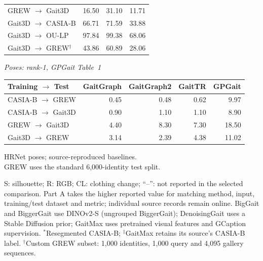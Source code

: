 \begin{table}[t]
\begin{minipage}[t]{0.49\textwidth}
\begin{tabular*}{\linewidth}{@{\extracolsep{\fill}}lrrr@{}}
GREW $\rightarrow$ Gait3D & 16.50 & 31.10 & 11.71 \\
Gait3D $\rightarrow$ CASIA-B & 66.71 & 71.59 & 33.88 \\
Gait3D $\rightarrow$ OU-LP & 97.84 & 99.38 & 68.06 \\
Gait3D $\rightarrow$ GREW$^{\dagger}$ & 43.86 & 60.89 & 28.06 \\
\bottomrule
\end{tabular*}
\end{minipage}\hfill
\begin{minipage}[t]{0.49\textwidth}
\textit{Poses: rank-1, GPGait Table~1~\cite{fu2023gpgait}}\par\vspace{2pt}
\begin{tabular*}{\linewidth}{@{\extracolsep{\fill}}lrrrr@{}}
\toprule
Training $\rightarrow$ Test & GaitGraph & GaitGraph2 & GaitTR & GPGait\\
\midrule
CASIA-B $\rightarrow$ GREW & 0.45 & 0.48 & 0.62 & 9.97 \\
CASIA-B $\rightarrow$ Gait3D & 0.90 & 1.10 & 1.10 & 8.90 \\
GREW $\rightarrow$ Gait3D & 4.40 & 8.30 & 7.30 & 18.50 \\
Gait3D $\rightarrow$ GREW & 3.14 & 2.39 & 4.38 & 11.02 \\
\bottomrule
\end{tabular*}
\par\vspace{3pt}
HRNet poses; source-reproduced baselines.\\
GREW uses the standard 6,000-identity test split.
\end{minipage}
\par\vspace{4pt}
\begin{minipage}{\textwidth}
\fontsize{7.5}{8.8}\selectfont
S: silhouette; R: RGB; CL: clothing change; ``--'': not reported in the selected comparison.
Part A takes the higher reported value for matching method, input, training/test dataset and metric; individual source records remain online.
BigGait and BiggerGait use DINOv2-S (ungrouped BiggerGait); DenoisingGait uses a Stable Diffusion prior; GaitMax uses pretrained visual features and GCaption supervision.
$^*$Resegmented CASIA-B; $^{\ddagger}$GaitMax retains its source's CASIA-B label.
$^{\dagger}$Custom GREW subset: 1,000 identities, 1,000 query and 4,095 gallery sequences.
\end{minipage}
\endgroup
\end{table}
